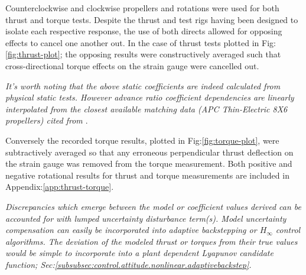 \par
Counterclockwise and clockwise propellers and rotations were used for both thrust and torque tests. Despite the thrust and test rigs having been designed to isolate each respective response, the use of both directs allowed for opposing effects to cancel one another out. In the case of thrust tests plotted in Fig:\ref{fig:thrust-plot}; the opposing results were constructively averaged such that cross-directional torque effects on the strain gauge were cancelled out. 
\par
{\color{Gray}\emph{It's worth noting that the above static coefficients are indeed calculated from physical static tests. However advance ratio coefficient dependencies are linearly interpolated from the closest available matching data (APC Thin-Electric 8X6 propellers) cited from \cite{UIUC}}.}
\par
Conversely the recorded torque results, plotted in Fig:\ref{fig:torque-plot}, were subtractively averaged so that any erroneous perpendicular thrust deflection on the strain gauge was removed from the torque measurement. Both positive and negative rotational results for thrust and torque measurements are included in Appendix:\ref{app:thrust-torque}.
\par
{\color{Gray}\emph{Discrepancies which emerge between the model or coefficient values derived can be accounted for with lumped uncertainty disturbance term(s). Model uncertainty compensation can easily be incorporated into adaptive backstepping or $H_\infty$ control algorithms. The deviation of the modeled thrust or torques from their true values would be simple to incorporate into a plant dependent Lyapunov candidate function; Sec:\ref{subsubsec:control.attitude.nonlinear.adaptivebackstep}.}}
